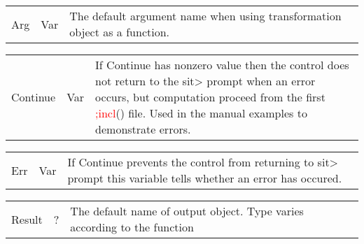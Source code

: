 \vspace{-1.51em}
\begin{table}[H]
 \begin{tabular}{ m{}  m{} p{}}
 Arg& Var & The default argument name when using transformation object as a function.
\end{tabular}
\end{table}
\vspace{-1.51em}
\begin{table}[H]
 \begin{tabular}{ m{}  m{} p{}}
 Continue &Var& If Continue has nonzero value then the control does not return to the
 sit> prompt when an error occurs, but computation proceed from the first \textcolor{Red}{;incl}() file.
 Used in the manual examples to demonstrate errors.
\end{tabular}
\end{table}
\vspace{-1.51em}
\begin{table}[H]
 \begin{tabular}{ m{}  m{} p{}}
 Err&Var& If Continue prevents the control from returning to sit> prompt
 this variable tells whether an error has occured.
\end{tabular}
\end{table}
\vspace{-1.51em}
\begin{table}[H]
 \begin{tabular}{ m{}  m{} p{}}
Result& ? & The default name of output object.
   Type varies according to the function
\end{tabular}
\end{table}
